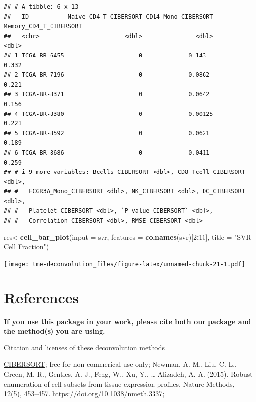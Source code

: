 \documentclass[
  12pt,
]{book}
\newenvironment{Shaded}{\begin{snugshade}}{\end{snugshade}}
\newcommand{\AttributeTok}[1]{\textcolor[rgb]{0.13,0.29,0.53}{#1}}
\newcommand{\DecValTok}[1]{\textcolor[rgb]{0.00,0.00,0.81}{#1}}
\newcommand{\FunctionTok}[1]{\textcolor[rgb]{0.13,0.29,0.53}{\textbf{#1}}}
\newcommand{\NormalTok}[1]{#1}
\newcommand{\OtherTok}[1]{\textcolor[rgb]{0.56,0.35,0.01}{#1}}
\newcommand{\SpecialCharTok}[1]{\textcolor[rgb]{0.81,0.36,0.00}{\textbf{#1}}}
\newcommand{\StringTok}[1]{\textcolor[rgb]{0.31,0.60,0.02}{#1}}
\begin{document}
\begin{verbatim}
## # A tibble: 6 x 13
##   ID           Naive_CD4_T_CIBERSORT CD14_Mono_CIBERSORT Memory_CD4_T_CIBERSORT
##   <chr>                        <dbl>               <dbl>                  <dbl>
## 1 TCGA-BR-6455                     0             0.143                    0.332
## 2 TCGA-BR-7196                     0             0.0862                   0.221
## 3 TCGA-BR-8371                     0             0.0642                   0.156
## 4 TCGA-BR-8380                     0             0.00125                  0.221
## 5 TCGA-BR-8592                     0             0.0621                   0.189
## 6 TCGA-BR-8686                     0             0.0411                   0.259
## # i 9 more variables: Bcells_CIBERSORT <dbl>, CD8_Tcell_CIBERSORT <dbl>,
## #   FCGR3A_Mono_CIBERSORT <dbl>, NK_CIBERSORT <dbl>, DC_CIBERSORT <dbl>,
## #   Platelet_CIBERSORT <dbl>, `P-value_CIBERSORT` <dbl>,
## #   Correlation_CIBERSORT <dbl>, RMSE_CIBERSORT <dbl>
\end{verbatim}

\begin{Shaded}
\begin{Highlighting}[]
\NormalTok{res}\OtherTok{\textless{}{-}}\FunctionTok{cell\_bar\_plot}\NormalTok{(}\AttributeTok{input =}\NormalTok{ svr, }\AttributeTok{features =} \FunctionTok{colnames}\NormalTok{(svr)[}\DecValTok{2}\SpecialCharTok{:}\DecValTok{10}\NormalTok{], }\AttributeTok{title =} \StringTok{"SVR Cell Fraction"}\NormalTok{)}
\end{Highlighting}
\end{Shaded}

\texttt{[image: tme-deconvolution\_files/figure-latex/unnamed-chunk-21-1.pdf]}

\hypertarget{references-2}{%
\section{References}\label{references-2}}

\textbf{If you use this package in your work, please cite both our package and the method(s) you are using.}

Citation and licenses of these deconvolution methods

\href{https://cibersort.stanford.edu/}{CIBERSORT}; free for non-commerical use only; Newman, A. M., Liu, C. L., Green, M. R., Gentles, A. J., Feng, W., Xu, Y., \ldots{} Alizadeh, A. A. (2015). Robust enumeration of cell subsets from tissue expression profiles. Nature Methods, 12(5), 453--457. \url{https://doi.org/10.1038/nmeth.3337};
\end{document}
